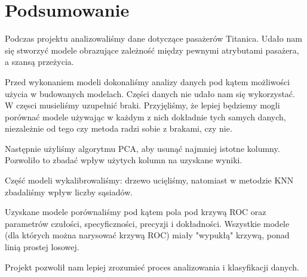 \documentclass{article}
\begin{document}
\section{Podsumowanie}
Podczas projektu analizowaliśmy dane dotyczące pasażerów Titanica. Udało nam się stworzyć modele obrazujące zależność między pewnymi atrybutami pasażera, a szansą przeżycia.

Przed wykonaniem modeli dokonaliśmy analizy danych pod kątem możliwości użycia w budowanych modelach. Części danych nie udało nam się wykorzystać.
W częsci musieliśmy uzupełnić braki. Przyjęliśmy, że lepiej będziemy mogli porównać modele używając w każdym z nich dokładnie tych samych danych,
niezależnie od tego czy metoda radzi sobie z brakami, czy nie.

Następnie użyliśmy algorytmu PCA, aby usunąć najmniej istotne kolumny. Pozwoliło to zbadać wpływ użytych kolumn na uzyskane wyniki.

Część modeli wykalibrowaliśmy: drzewo ucięliśmy, natomiast w metodzie KNN zbadaliśmy wpływ liczby sąsiadów.

Uzyskane modele porównaliśmy pod kątem pola pod krzywą ROC oraz parametrów czułości, specyficzności, precyzji i dokładności.
Wszystkie modele (dla których można narysować krzywą ROC) miały "wypukłą" krzywą, ponad linią prostej losowej.

Projekt pozwolił nam lepiej zrozumieć proces analizowania i klasyfikacji danych.
\end{document}
